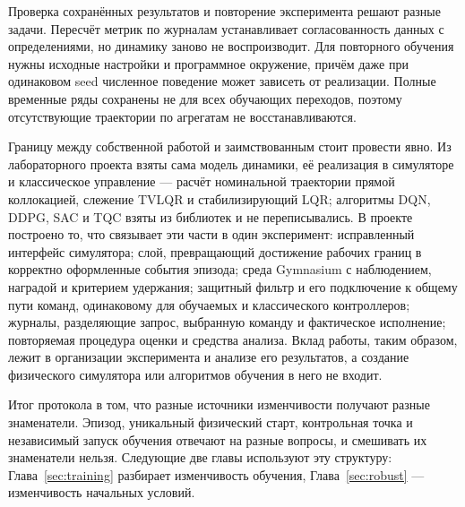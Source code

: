 Проверка сохранённых результатов и повторение эксперимента решают разные задачи. Пересчёт метрик по журналам устанавливает согласованность данных с определениями, но динамику заново не воспроизводит. Для повторного обучения нужны исходные настройки и программное окружение, причём даже при одинаковом seed численное поведение может зависеть от реализации. Полные временные ряды сохранены не для всех обучающих переходов, поэтому отсутствующие траектории по агрегатам не восстанавливаются.

Границу между собственной работой и заимствованным стоит провести явно. Из лабораторного проекта взяты сама модель динамики, её реализация в симуляторе и классическое управление — расчёт номинальной траектории прямой коллокацией, слежение TVLQR и стабилизирующий LQR; алгоритмы DQN, DDPG, SAC и TQC взяты из библиотек и не переписывались. В проекте построено то, что связывает эти части в один эксперимент: исправленный интерфейс симулятора; слой, превращающий достижение рабочих границ в корректно оформленные события эпизода; среда Gymnasium с наблюдением, наградой и критерием удержания; защитный фильтр и его подключение к общему пути команд, одинаковому для обучаемых и классического контроллеров; журналы, разделяющие запрос, выбранную команду и фактическое исполнение; повторяемая процедура оценки и средства анализа. Вклад работы, таким образом, лежит в организации эксперимента и анализе его результатов, а создание физического симулятора или алгоритмов обучения в него не входит.

Итог протокола в том, что разные источники изменчивости получают разные знаменатели. Эпизод, уникальный физический старт, контрольная точка и независимый запуск обучения отвечают на разные вопросы, и смешивать их знаменатели нельзя. Следующие две главы используют эту структуру: Глава~\ref{sec:training} разбирает изменчивость обучения, Глава~\ref{sec:robust} — изменчивость начальных условий.
